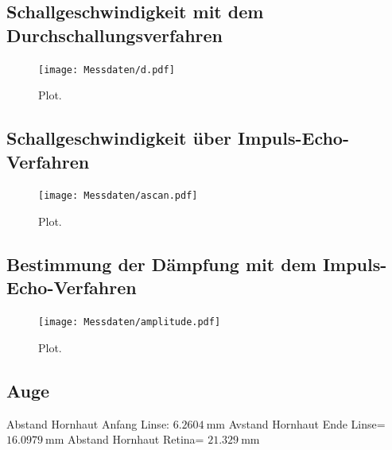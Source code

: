 \subsection{Schallgeschwindigkeit mit dem Durchschallungsverfahren}
\begin{figure}
  \centering
  \texttt{[image: Messdaten/d.pdf]}
  \caption{Plot.}
  \label{fig:durchschall}
\end{figure}
\FloatBarrier

\subsection{Schallgeschwindigkeit über Impuls-Echo-Verfahren}
\begin{figure}
  \centering
  \texttt{[image: Messdaten/ascan.pdf]}
  \caption{Plot.}
  \label{fig:iev}
\end{figure}
\FloatBarrier
\subsection{Bestimmung der Dämpfung mit dem Impuls-Echo-Verfahren}
\begin{figure}
  \centering
  \texttt{[image: Messdaten/amplitude.pdf]}
  \caption{Plot.}
  \label{fig:daempf}
\end{figure}
\FloatBarrier

\subsection{Auge}

Abstand Hornhaut Anfang Linse:  $\SI{6,2604}{\milli\meter}$
Avstand Hornhaut Ende Linse=  $\SI{16,0979}{\milli\meter}$
Abstand Hornhaut Retina=  $\SI{21,329}{\milli\meter}$
